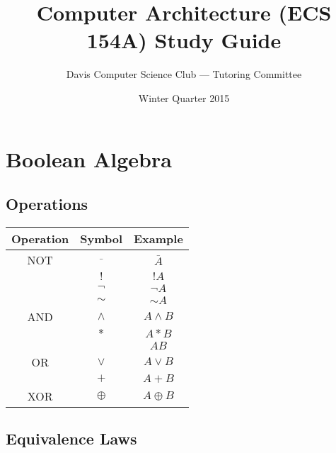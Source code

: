 \documentclass[11pt]{article}
\title{Computer Architecture (ECS 154A) Study Guide}
\author{Davis Computer Science Club --- Tutoring Committee}
\date{Winter Quarter 2015}
\begin{document}
\begin{titlepage}
\maketitle
\end{titlepage}

\tableofcontents

\pagebreak

\section{Boolean Algebra}

\subsection{Operations}

\begin{table}[H]
	\centering
	\begin{tabular}{c | c | c}
		Operation	&	Symbol			&	Example\\
		\hline
		NOT			&	\( \bar{ } \)	&	\( \bar{A} \)\\
					&	\( ! \)			&	\( !A \)\\
					&	\( \neg \)		&	\( \neg A \)\\
					&	\( \sim \)		&	\( \sim A \)\\
		\hline
		AND			&	\( \wedge \)	&	\( A \wedge B \)\\
					&	\( * \)			&	\( A * B \)\\
					&					&	\( AB \)\\
		\hline
		OR			&	\( \vee \)		&	\( A \vee B \)\\
					&	\( + \)			&	\( A + B\)\\
		\hline
		XOR			&	\( \oplus \)	&	\( A \oplus B \)
	\end{tabular}
\end{table}

\subsection{Equivalence Laws}
\end{document}
